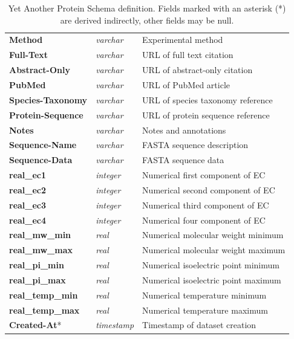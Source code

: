 \begin{table}[H]
\begin{tabular}{| l | l | l |}
\textbf{Method} & \textit{varchar} & Experimental method\\
\textbf{Full-Text} & \textit{varchar} & URL of full text citation\\
\textbf{Abstract-Only} & \textit{varchar} & URL of abstract-only citation\\
\textbf{PubMed} & \textit{varchar} & URL of PubMed article\\
\textbf{Species-Taxonomy} & \textit{varchar} & URL of species taxonomy reference\\
\textbf{Protein-Sequence} & \textit{varchar} & URL of protein sequence reference\\
\textbf{Notes} & \textit{varchar} & Notes and annotations\\
\textbf{Sequence-Name} & \textit{varchar} & FASTA sequence description\\
\textbf{Sequence-Data} & \textit{varchar} & FASTA sequence data\\
\textbf{real\_ec1} & \textit{integer} & Numerical first component of EC\\
\textbf{real\_ec2} & \textit{integer} & Numerical second component of EC\\
\textbf{real\_ec3} & \textit{integer} & Numerical third component of EC\\
\textbf{real\_ec4} & \textit{integer} & Numerical four component of EC\\
\textbf{real\_mw\_min} & \textit{real} & Numerical molecular weight minimum\\
\textbf{real\_mw\_max} & \textit{real} & Numerical molecular weight maximum\\
\textbf{real\_pi\_min} & \textit{real} & Numerical isoelectric point minimum\\
\textbf{real\_pi\_max} & \textit{real} & Numerical isoelectric point maximum\\
\textbf{real\_temp\_min} & \textit{real} & Numerical temperature minimum\\
\textbf{real\_temp\_max} & \textit{real} & Numerical temperature maximum\\
\textbf{Created-At}* & \textit{timestamp} & Timestamp of dataset creation\\
\hline
\end{tabular}
\caption[Yet Another Protein Schema definition]
        {Yet Another Protein Schema definition. Fields marked with an
          asterisk (*) are derived indirectly, other fields may be null.}
\label{tab:yaps-schema}
\end{table}

